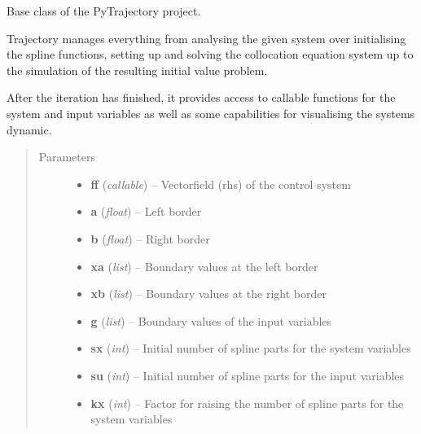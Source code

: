 \documentclass[letterpaper,10pt,english]{sphinxmanual}
\begin{document}
\begin{fulllineitems}
\label{pytrajectory:pytrajectory.trajectory.Trajectory}
Base class of the PyTrajectory project.

Trajectory manages everything from analysing the given system over initialising the spline
functions, setting up and solving the collocation equation system up to the simulation of the
resulting initial value problem.

After the iteration has finished, it provides access to callable functions for the system and
input variables as well as some capabilities for visualising the systems dynamic.
\begin{quote}\begin{description}
\item[{Parameters}] \leavevmode\begin{itemize}
\item {} 
\textbf{ff} (\emph{callable}) -- Vectorfield (rhs) of the control system

\item {} 
\textbf{a} (\emph{float}) -- Left border

\item {} 
\textbf{b} (\emph{float}) -- Right border

\item {} 
\textbf{xa} (\emph{list}) -- Boundary values at the left border

\item {} 
\textbf{xb} (\emph{list}) -- Boundary values at the right border

\item {} 
\textbf{g} (\emph{list}) -- Boundary values of the input variables

\item {} 
\textbf{sx} (\emph{int}) -- Initial number of spline parts for the system variables

\item {} 
\textbf{su} (\emph{int}) -- Initial number of spline parts for the input variables

\item {} 
\textbf{kx} (\emph{int}) -- Factor for raising the number of spline parts for the system variables


\end{itemize}
\end{description}
\end{quote}
\end{fulllineitems}
\end{document}
